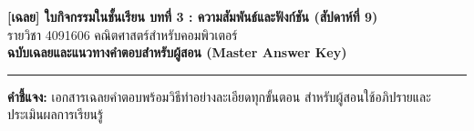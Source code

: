 \documentclass[a4paper,12pt]{article}
\begin{document}
\noindent
\begin{minipage}[c]{0.78\textwidth}
  {\Large\bfseries\color{navy} [เฉลย] ใบกิจกรรมในชั้นเรียน บทที่ 3 : ความสัมพันธ์และฟังก์ชัน (สัปดาห์ที่ 9)}\\[0.1em]
  {\normalsize รายวิชา 4091606 คณิตศาสตร์สำหรับคอมพิวเตอร์}\\[0.5em]
  {\bfseries\color{ans} ฉบับเฉลยและแนวทางคำตอบสำหรับผู้สอน (Master Answer Key)}
\end{minipage}\hfill
\begin{minipage}[c]{0.2\textwidth}
  \centering
\end{minipage}
\par\vspace{0.3em}\hrule\vspace{0.4em}

\noindent\textbf{คำชี้แจง:} เอกสารเฉลยคำตอบพร้อมวิธีทำอย่างละเอียดทุกขั้นตอน สำหรับผู้สอนใช้อภิปรายและประเมินผลการเรียนรู้
\vspace{0.3em}
\end{document}
